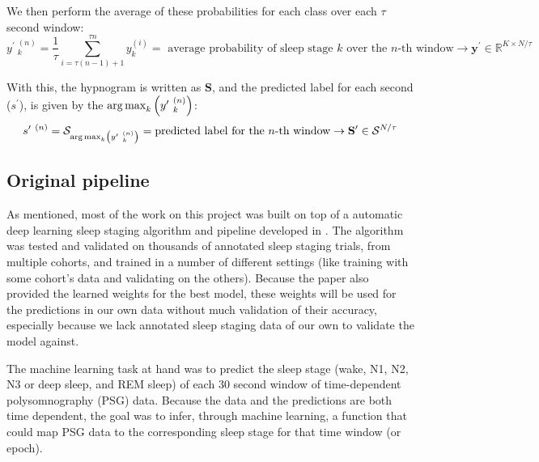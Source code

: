 We then perform the average of these probabilities for each class over each $\tau$ second window:
\begin{equation}
    y^{\prime} \ _k^{(n)} = \frac{1}{\tau} \sum_{i=\tau(n-1)+1}^{\tau n} y_k^{(i)} = \text{ average probability of sleep stage $k$ over the $n$-th window} \rightarrow \mathbf{y^{\prime}} \in \mathbb{R}^{K \times N/\tau}
\end{equation}

With this, the hypnogram is written as $\mathbf{S}$, and the predicted label for each second ($s^{\prime}$), is given by the $\argmax_k \left(y^{\prime} \ _k^{(n)} \right)$:
\begin{equation}
    s^{\prime} \ ^{(n)} = \mathcal{S}_{\argmax_{k} \left(y^{\prime} \ _k^{(n)} \right)} = \text{predicted label for the $n$-th window} \rightarrow \mathbf{S^{\prime}} \in \mathcal{S}^{N/\tau}
\end{equation}


%




\subsection{Original pipeline} %
\label{section:original_pipeline}
As mentioned, most of the work on this project was built on top of a automatic deep learning sleep staging algorithm and pipeline developed in \cite{Alexander2020}. The algorithm was tested and validated on thousands of annotated sleep staging trials, from multiple cohorts, and trained in a number of different settings (like training with some cohort's data and validating on the others). Because the paper also provided the learned weights for the best model, these weights will be used for the predictions in our own data without much validation of their accuracy, especially because we lack annotated sleep staging data of our own to validate the model against.

The machine learning task at hand was to predict the sleep stage (wake, N1, N2, N3 or deep sleep, and REM sleep) of each 30 second window of time-dependent polysomnography (PSG) data. Because the data and the predictions are both time dependent, the goal was to infer, through machine learning, a function that could map PSG data to the corresponding sleep stage for that time window (or epoch).



